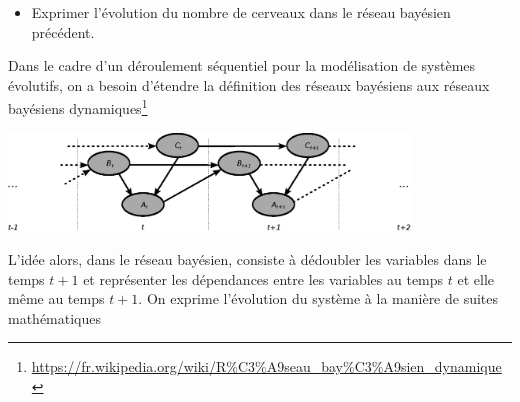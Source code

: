 \documentclass[a4paper, 10pt]{article}
\begin{document}
  \begin{itemize}[$\bigcirc$]
   \item Exprimer l'évolution du nombre de cerveaux dans le réseau bayésien précédent.
  \end{itemize}

  Dans le cadre d'un déroulement séquentiel pour la modélisation de systèmes évolutifs, on a besoin d'étendre la définition des réseaux bayésiens aux réseaux bayésiens dynamiques\footnote{\url{https://fr.wikipedia.org/wiki/R\%C3\%A9seau_bay\%C3\%A9sien_dynamique}}

  \begin{center}
    \includegraphics[width=0.8\textwidth]{fig/resbay_dyn}
  \end{center}

  \newpage

  L'idée alors, dans le réseau bayésien, consiste à dédoubler les variables dans le temps $t+1$ et représenter les dépendances entre les variables au temps $t$ et elle même au temps $t+1$. On exprime l'évolution du système à la manière de suites mathématiques
\end{document}
